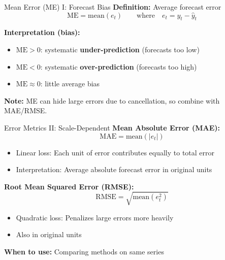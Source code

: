 \documentclass[11pt]{beamer}
\begin{document}
\begin{frame}[fragile]{Mean Error (ME) I: Forecast Bias}
    \textbf{Definition:} Average forecast error
    \begin{equation}
		\text{ME} = \text{mean}(e_t) \qquad \text{where} \quad  e_t = y_t - \hat{y}_{t}
	\end{equation}

    \vspace{0.4cm}
    \textbf{Interpretation (bias):}
    \begin{itemize}
        \item $\text{ME} > 0$: systematic \textbf{under-prediction} (forecasts too low)
        \item $\text{ME} < 0$: systematic \textbf{over-prediction} (forecasts too high)
        \item $\text{ME} \approx 0$: little average bias
    \end{itemize}

    \vspace{0.3cm}
    \textbf{Note:} ME can hide large errors due to cancellation, so combine with MAE/RMSE.
\end{frame}

\begin{frame}[fragile]{Error Metrics II: Scale-Dependent}
    \textbf{Mean Absolute Error (MAE):}
    \begin{equation}
        \text{MAE} = \text{mean}(|e_t|)
    \end{equation}
    \begin{itemize}
		\item Linear loss: Each unit of error contributes equally to total error
        \item Interpretation: Average absolute forecast error in original units
    \end{itemize}

    \vspace{0.5cm}
    \textbf{Root Mean Squared Error (RMSE):}
    \begin{equation}
        \text{RMSE} = \sqrt{\text{mean}(e_t^2)}
    \end{equation}
    \begin{itemize}
        \item Quadratic loss: Penalizes large errors more heavily
        \item Also in original units
    \end{itemize}

    \vspace{0.5cm}
    \textbf{When to use:} Comparing methods on same series
\end{frame}
\end{document}
